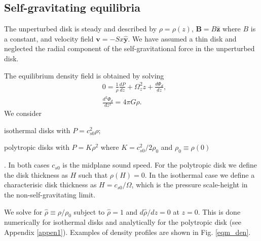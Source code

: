 \subsection{Self-gravitating equilibria} 
The unperturbed disk is steady and described by
$\rho=\rho(z)$, $\bm{B} = B\hat{\bm{z}}$ where $B$ is a constant, and
velocity field $\bm{v} = -Sx\hat{\bm{y}}$. We have assumed a thin disk 
and neglected the radial component of the self-gravitational force in
the unperturbed disk.    

The equilibrium density field is obtained by solving
\begin{align}
  &0=\frac{1}{\rho}\frac{d P}{dz} + \Omega_z^2z + \frac{d\Phi_d}{dz},\label{eqm_eqns1}\\
  &\frac{d^2\Phi_d}{dz^2} = 4\pi G \rho.\label{eqm_eqns2}
\end{align}
We consider \begin{inparaenum}[(i)]
\item isothermal disks with $P=c_{s0}^2\rho$\label{iso_eos}; 
\item polytropic disks with $P=K\rho^2$ where $K=c_{s0}^2/2\rho_0$ and $\rho_0\equiv\rho(0)$
\end{inparaenum}.
In both cases $c_{s0}$ is the midplane sound speed. For the polytropic
disk we define the disk thickness as $H$ such that $\rho(H)=0$. In the
isothermal case we define a characterisic disk thickness as
$H=c_{s0}/\Omega$, which is the pressure scale-height in the
non-self-gravitating limit. 

We solve for $\hat{\rho}\equiv\rho/\rho_0$ subject to $\hat{\rho}=1$
and $d\hat{\rho}/dz=0$  at $z=0$. This is done numerically for
isothermal disks and analytically for the polytropic disk (see
Appendix \ref{appen1}). Examples of density profiles are shown in
Fig. \ref{eqm_den}. 


